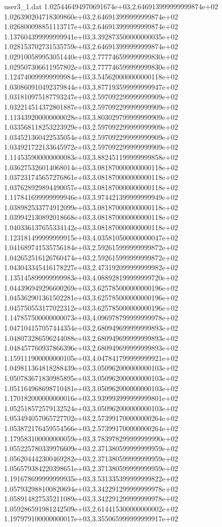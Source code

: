 \begin{filecontents}{user3_1.dat}
1.025446494970691674e+03,2.646913999999999874e+02
1.026390204718309860e+03,2.646913999999999874e+02
1.026800098851113717e+03,2.646913999999999874e+02
1.137604399999999941e+03,3.392873500000000035e+02
1.028153702731535759e+03,2.646913999999999874e+02
1.029100589953051440e+03,2.777746599999999830e+02
1.029507306611957802e+03,2.777746599999999830e+02
1.124740099999999984e+03,3.545620000000000118e+02
1.030860910492379844e+03,3.877193599999999947e+02
1.031810975187793247e+03,2.597092299999999909e+02
1.032214514372801887e+03,2.597092299999999909e+02
1.113439200000000028e+03,3.803029799999999909e+02
1.033568118253223929e+03,2.597092299999999909e+02
1.034521360422535054e+03,2.597092299999999909e+02
1.034921722133645972e+03,2.597092299999999909e+02
1.114535900000000083e+03,3.882451199999999858e+02
1.036275326014068014e+03,3.081870000000000118e+02
1.037231745657276861e+03,3.081870000000000118e+02
1.037628929894490057e+03,3.081870000000000118e+02
1.117841699999999946e+03,3.974421399999999949e+02
1.038982533774912099e+03,3.081870000000000118e+02
1.039942130892018668e+03,3.081870000000000118e+02
1.040336137655334142e+03,3.081870000000000118e+02
1.123181499999999915e+03,4.035810500000000047e+02
1.041689741535756184e+03,2.592615999999999872e+02
1.042652516126760474e+03,2.592615999999999872e+02
1.043043345416178227e+03,2.473192099999999982e+02
1.135145899999999983e+03,4.088928199999999720e+02
1.044396949296600269e+03,3.625785000000000196e+02
1.045362901361502281e+03,3.625785000000000196e+02
1.045750553177022312e+03,3.625785000000000196e+02
1.147857500000000073e+03,4.096978799999999978e+02
1.047104157057444354e+03,2.680949699999999893e+02
1.048073286596244088e+03,2.680949699999999893e+02
1.048457760937866396e+03,2.680949699999999893e+02
1.159111900000000105e+03,4.047841799999999921e+02
1.049811364818288439e+03,3.050962000000000103e+02
1.050783671830985895e+03,3.050962000000000103e+02
1.051164968698710481e+03,3.050962000000000103e+02
1.170182000000000016e+03,3.939993999999999801e+02
1.052518572579132524e+03,3.050962000000000103e+02
1.053494057065727702e+03,2.573991700000000264e+02
1.053872176459554566e+03,2.573991700000000264e+02
1.179583100000000059e+03,3.783978299999999990e+02
1.055225780339976609e+03,2.371380599999999959e+02
1.056204442300469282e+03,2.371380599999999959e+02
1.056579384220398651e+03,2.371380599999999959e+02
1.191678699999999935e+03,3.531335399999999822e+02
1.057932988100820694e+03,3.342291299999999978e+02
1.058914827535211089e+03,3.342291299999999978e+02
1.059286591981242509e+03,2.614415300000000002e+02
1.197979100000000017e+03,3.355065999999999917e+02

\end{filecontents}
